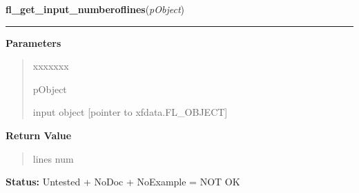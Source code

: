 \hspace{.8\funcindent}\begin{boxedminipage}{\funcwidth}

    \raggedright \textbf{fl\_get\_input\_numberoflines}(\textit{pObject})

    \vspace{-1.5ex}

    \rule{\textwidth}{0.5\fboxrule}
\setlength{\parskip}{2ex}
\setlength{\parskip}{1ex}
      \textbf{Parameters}
      \vspace{-1ex}

      \begin{quote}
        \begin{Ventry}{xxxxxxx}

          \item[pObject]

          input object [pointer to xfdata.FL\_OBJECT]

        \end{Ventry}

      \end{quote}

      \textbf{Return Value}
    \vspace{-1ex}

      \begin{quote}
      lines num

      \end{quote}

\textbf{Status:} Untested + NoDoc + NoExample = NOT OK



    \end{boxedminipage}

    \label{xformslib:library:fl_get_input_format}

    \vspace{0.5ex}

